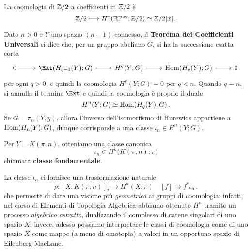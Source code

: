 	\begin{ex}
		La coomologia di ${\mathbb Z}/2$ a coefficienti in ${\mathbb Z}/2$ è
		\begin{equation*}
			{\mathbb Z}/2 \longmapsto H^{\ast}({\mathbb R}\mathbb{P}^{\infty}; {\mathbb Z}/2) \simeq {\mathbb Z}/2[x]\,.
		\end{equation*}
	\end{ex}
	
	Dato $n>0$ e $Y$ uno spazio $(n-1)$-connesso,
	il \textbf{Teorema dei Coefficienti Universali} ci dice
	che, per un gruppo abeliano $G$, si ha la successione esatta corta
	\begin{equation*}
		\begin{tikzcd}
			0 \ar[r]
			& \Ext(H_{q-1}(Y);G) \ar[r]
			& H^{q}(Y;G) \ar[r]
			& \Hom(H_{q}(Y);G) \ar[r]
			& 0\,
		\end{tikzcd}
	\end{equation*}
	 per ogni $q>0$, e quindi la coomologia $H^{q}(Y;G) = 0$ per $q < n$.
	 Quando $q=n$, si annulla il termine $\Ext$ e quindi la coomologia
	 è proprio il duale
	 \begin{equation*}
	 	H^{n}(Y;G) \simeq \operatorname{Hom}(H_{q}(Y),G)\,.
	 \end{equation*}
	Se $G=\pi_{n}(Y,y)$, allora l'inverso dell'isomorfismo di Hurewicz
	appartiene a $\operatorname{Hom}(H_{n}(Y),G)$, dunque corrisponde a una classe
	$\iota_{n} \in H^{n}(Y;G)$.
	\begin{df}
		Per $Y = K(\pi,n)$, otteniamo una classe canonica
		\begin{equation*}
			\iota_{n} \in H^{n}\big(K(\pi,n);\pi\big)
		\end{equation*}
		chiamata \textbf{classe fondamentale}.
	\end{df}
	La classe $\iota_{n}$ ci fornisce una trasformazione naturale
	\begin{equation}\label{classe-k-pi-n}
		\rho: [X,K(\pi,n)]_{\ast} \longrightarrow H^{n}(X;\pi)
		\quad [f] \longmapsto f^{*}\iota_{n}\,.
	\end{equation}
	che permette di dare una visione più \emph{geometrica} ai gruppi di coomologia:
	infatti, nel corso di Elementi di Topologia Algebrica abbiamo ottenuto $H^{n}$
	tramite un processo \emph{algebrico astratto}, 
	dualizzando il complesso di catene singolari di uno spazio $X$;
	invece, adesso possiamo interpretare le classi di coomologia
	come di uno spazio $X$ come mappe (a meno di omotopia) 
	a valori in un opportuno spazio di Eilenberg-MacLane.
	
